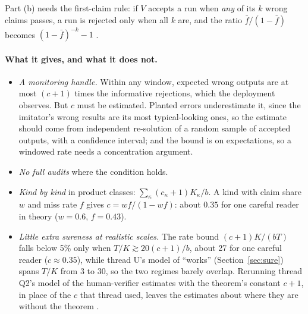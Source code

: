 \documentclass[11pt]{article}
\theoremstyle{definition}
\theoremstyle{remark}
\newcommand{\K}{K}
\begin{document}
Part (b) needs the first-claim rule: if $V$ accepts a run when \emph{any} of its $k$ wrong claims passes, a run is rejected only when all $k$ are, and the ratio $\bar f/(1-\bar f)$ becomes $(1-\bar f)^{-k}-1$ \cite{referee9}.

\paragraph{What it gives, and what it does not.}
\begin{itemize}[nosep]
\item \emph{A monitoring handle.} Within any window, expected wrong outputs are at most $(c+1)$ times the informative rejections, which the deployment observes. But $c$ must be estimated. Planted errors underestimate it, since the imitator's wrong results are its most typical-looking ones, so the estimate should come from independent re-solution of a random sample of accepted outputs, with a confidence interval; and the bound is on expectations, so a windowed rate needs a concentration argument.
\item \emph{No full audits} where the condition holds.
\item \emph{Kind by kind} in product classes: $\sum_\kappa(c_\kappa+1)\K_\kappa/b$. A kind with claim share $w$ and miss rate $f$ gives $c=wf/(1-wf)$: about $0.35$ for one careful reader in theory ($w=0.6$, $f=0.43$).
\item \emph{Little extra sureness at realistic scales.} The rate bound $(c+1)\K/(bT)$ falls below 5\% only when $T/\K\gtrsim20(c+1)/b$, about 27 for one careful reader ($c\approx0.35$), while thread U's model of ``works'' (Section~\ref{sec:sure}) spans $T/\K$ from 3 to 30, so the two regimes barely overlap. Rerunning thread Q2's model of the human-verifier estimates with the theorem's constant $c+1$, in place of the $c$ that thread used, leaves the estimates about where they are without the theorem \cite{redteam3}.
\end{itemize}
\end{document}
